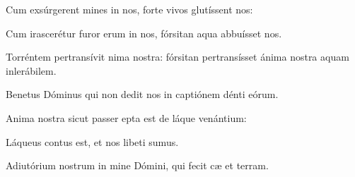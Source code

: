\item {}

\item Cum exsúrgerent mines in nos,\psstar{} forte vivos glutíssent nos:

\item Cum irascerétur furor erum in nos,\psstar{} fórsitan aqua abbuísset nos.

\item Torréntem pertransívit nima nostra:\psstar{} fórsitan pertransísset ánima nostra aquam inlerábilem.

\item Benetus Dóminus\psstar{} qui non dedit nos in captiónem dénti eórum.

\item Anima nostra sicut passer epta est\psstar{} de láque venántium:

\item Láqueus contus est,\psstar{} et nos libeti sumus.

\item Adiutórium nostrum in mine Dómini,\psstar{} qui fecit cæ et terram.
